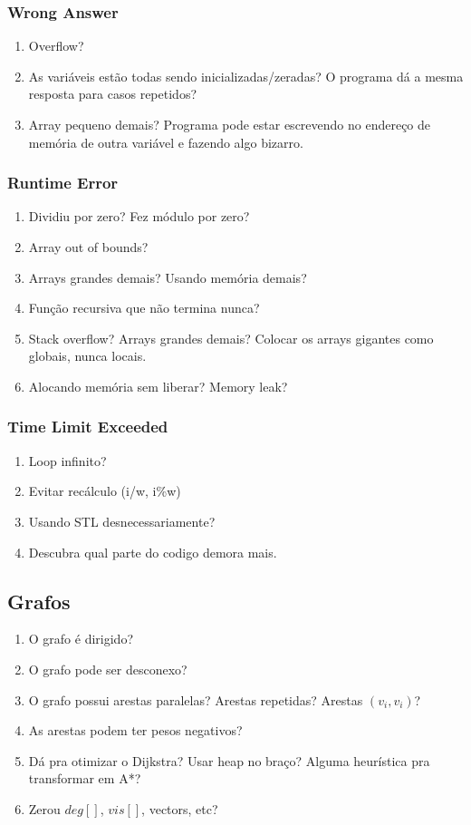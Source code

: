 \documentclass[12pt,a4paper]{article}
\begin{document}
			\subsubsection{Wrong Answer}
				\begin{enumerate}
					\item Overflow?
					\item As variáveis estão todas sendo inicializadas/zeradas? O programa dá a mesma resposta para casos repetidos?
					\item Array pequeno demais? Programa pode estar escrevendo no endereço de memória de outra variável e fazendo algo bizarro.
				\end{enumerate}
			\subsubsection{Runtime Error}
				\begin{enumerate}
					\item Dividiu por zero? Fez módulo por zero?
					\item Array out of bounds?
					\item Arrays grandes demais? Usando memória demais?
					\item Função recursiva que não termina nunca?
					\item Stack overflow? Arrays grandes demais? Colocar os arrays gigantes como globais, nunca locais.
					\item Alocando memória sem liberar? Memory leak?
				\end{enumerate}
			\subsubsection{Time Limit Exceeded}
				\begin{enumerate}
					\item Loop infinito?
					\item Evitar recálculo (i/w, i\%w)
					\item Usando STL desnecessariamente?
					\item Descubra qual parte do codigo demora mais.
				\end{enumerate}
		\subsection{Grafos}
			\begin{enumerate}
				\item O grafo é dirigido?
				\item O grafo pode ser desconexo?
				\item O grafo possui arestas paralelas? Arestas repetidas? Arestas $(v_i,v_i)$?
				\item As arestas podem ter pesos negativos?
				\item Dá pra otimizar o Dijkstra? Usar heap no braço? Alguma heurística pra transformar em A*?
				\item Zerou $deg[]$, $vis[]$, vectors, etc?
			\end{enumerate}
\end{document}
